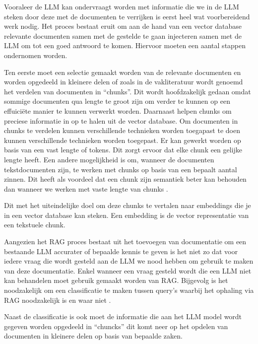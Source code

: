     Vooraleer de LLM kan ondervraagt worden met informatie die we in de LLM steken door deze met de documenten te verrijken is eerst heel wat voorbereidend werk nodig. Het proces bestaat eruit om aan de hand van een vector database relevante documenten samen met de gestelde te gaan injecteren samen met de LLM om tot een goed antwoord te komen. Hiervoor moeten een aantal stappen ondernomen worden.
    
    Ten eerste moet een selectie gemaakt worden van de relevante documenten en worden opgedeeld in kleinere delen of zoals in de vakliteratuur wordt genoemd het verdelen van documenten in “chunks”. Dit wordt hoofdzakelijk gedaan omdat sommige documenten qua lengte te groot zijn om verder te kunnen op een effuiciëte manier te kunnen verwerkt worden. Daarnaast helpen chunks om preciese informatie in op te halen uit de vector database.  Om documenten in chunks te verdelen kunnen verschillende technieken worden toegapast te doen kunnen verschillende technieken worden toegepast. Er kan gewerkt worden op basis van een vast lengte of tokens. Dit zorgt ervoor dat elke chunk een gelijke lengte heeft. Een andere mogelijkheid is om, wanneer de documenten tekstdocumenten zijn, te werken met chunks op basis van een bepaalt aantal zinnen. Dit heeft als voordeel dat een chunk zijn semantiek beter kan behouden dan wanneer we werken met vaste lengte van chunks \autocite{Wang2024}.
    
    Dit met het uiteindelijke doel om deze chunks te vertalen naar embeddings die je in een vector database kan steken. Een embedding is de vector representatie van een tekstuele chunk. 
    
    Aangezien het RAG proces bestaat uit het toevoegen van documentatie om een bestaande LLM accurater of bepaalde kennis te geven is het niet zo dat voor iedere vraag die wordt gesteld aan de LLM we nood hebben om gebruik te maken van deze documentatie. Enkel wanneer een vraag gesteld wordt die een LLM niet kan behandelen moet gebruik gemaakt worden van RAG. Bijgevolg is het noodzakelijk om een classificatie te maken tussen query's waarbij het ophaling via RAG noodzakelijk is en waar niet \autocite{Wang2024}.
    
    Naast de classificatie is ook moet de informatie die aan het LLM model wordt gegeven worden opgedeeld in “chuncks” dit komt neer op het opdelen van documenten in kleinere delen op basis van bepaalde zaken. 

